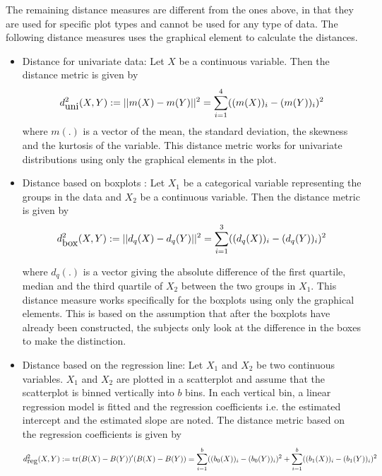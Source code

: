 \documentclass[12]{article}
\newcommand{\blue}[1]{{\color{blue} #1}}
\begin{document}

The remaining distance measures are different from the ones above, in that they are used for specific plot types and cannot be used for any type of data. The following distance measures uses the graphical element to calculate the distances.

\begin{itemize}
\item Distance for univariate data: Let $X$ be a continuous variable. Then the distance metric is given by
\[
d^2_{\hbox{uni}}(X, Y) := ||m(X) - m(Y)||^2 = \sum_{i=1}^4 ((m(X))_i - (m(Y))_i)^2
\]
where $m(.)$ is a vector of the mean, the standard deviation, the skewness and the kurtosis of the variable. This distance metric works for univariate distributions using only the graphical elements in the plot.


\item Distance based on boxplots : Let $X_1$ be a categorical variable representing the groups in the data and $X_2$ be a continuous variable. Then the distance metric is given by
 \[
d^2_{\hbox{box}}(X, Y) := || d_q(X) - d_q(Y)||^2 = \sum_{i=1}^3 ((d_q(X))_i - (d_q(Y))_i)^2
\]

where $d_q(.)$ is a vector giving the absolute difference of the first quartile, median and the third quartile of $X_2$ between the two groups in $X_1$. This distance measure works specifically for the boxplots using only the graphical elements. This is based on the assumption that after the boxplots have already been constructed, the subjects only look at the difference in the boxes to make the distinction. 


\item Distance based on the regression line: Let $X_1$ and $X_2$ be two continuous variables. $X_1$ and $X_2$ are plotted in a scatterplot and assume that the scatterplot is binned vertically into $b$ bins. In each vertical bin, a linear regression model is fitted and the regression coefficients i.e. the estimated intercept and the estimated slope are noted. The distance metric based on the regression coefficients is given by
 \[
d^2_{\hbox{reg}}(X, Y) := \hbox{tr} (B(X) - B(Y))' (B(X) - B(Y)) = \sum_{i=1}^b ((b_0(X))_i - (b_0(Y))_i)^2 + \sum_{i=1}^b ((b_1(X))_i - (b_1(Y))_i)^2
\]


\end{itemize}
\end{document}
